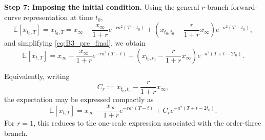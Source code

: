 \documentclass[12pt]{article}
\theoremstyle{statementstyle}
\begin{document}
\begin{appendices}
\medskip
\noindent\textbf{Step 7: Imposing the initial condition.}
Using the general \(r\)-branch forward-curve representation at time \(t_0\),
\[
\mathbb{E}[x_{t_0,T}]=x_{t_0,T}
=
x_{\infty}
-
\frac{x_{\infty}}{1+r}e^{-ra^{2}(T-t_0)}
+
\left(x_{t_0,t_0}-\frac{r}{1+r}x_{\infty}\right)e^{-a^{2}(T-t_0)},
\]
and simplifying \eqref{eq:B3_pre_final}, we obtain
\begin{equation}
\boxed{
\mathbb{E}[x_{t,T}]
=
x_{\infty}
-
\frac{x_{\infty}}{1+r}e^{-ra^{2}(T-t)}
+
\left(x_{t_0,t_0}-\frac{r}{1+r}x_{\infty}\right)
e^{-a^{2}(T+t-2t_0)}.
}
\label{eq:B3_final_expectation}
\tag{B.3.5}
\end{equation}

Equivalently, writing
\[
C_r:=x_{t_0,t_0}-\frac{r}{1+r}x_{\infty},
\]
the expectation may be expressed compactly as
\begin{equation}
\boxed{
\mathbb{E}[x_{t,T}]
=
x_{\infty}
-
\frac{x_{\infty}}{1+r}e^{-ra^{2}(T-t)}
+
C_r e^{-a^{2}(T+t-2t_0)}.
}
\tag{B.3.6}\label{eq:B36}
\end{equation}
For \(r=1\), this reduces to the one-scale expression associated with the order-three branch.





\end{appendices}
\end{document}
